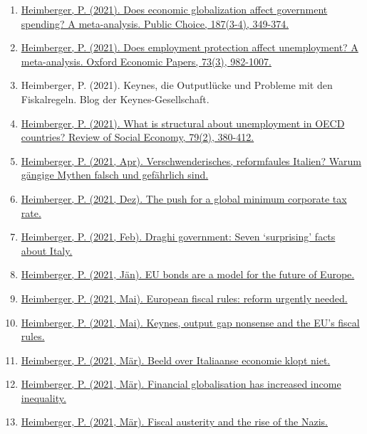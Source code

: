 \begin{enumerate}
	 \item \href{https://doi.org/10.1007/s11127-020-00784-8}{Heimberger, P. (2021). Does economic globalization affect government spending? A meta-analysis. Public Choice, 187(3-4), 349-374.}
	 \item \href{https://doi.org/10.1093/oep/gpaa037}{Heimberger, P. (2021). Does employment protection affect unemployment? A meta-analysis. Oxford Economic Papers, 73(3), 982-1007.}
	 \item Heimberger, P. (2021). Keynes, die Outputlücke und Probleme mit den Fiskalregeln. Blog der Keynes-Gesellschaft.
	 \item \href{https://doi.org/10.1080/00346764.2019.1678067}{Heimberger, P. (2021). What is structural about unemployment in OECD countries? Review of Social Economy, 79(2), 380-412.}
	 \item \href{https://jbi.or.at/wp-content/uploads/2021/05/Perspektiven_2021_04_final.pdf}{Heimberger, P. (2021, Apr). Verschwenderisches, reformfaules Italien? Warum gängige Mythen falsch und gefährlich sind.}
	 \item \href{https://wiiw.ac.at/the-push-for-a-global-minimum-corporate-tax-rate-n-495.html}{Heimberger, P. (2021, Dez). The push for a global minimum corporate tax rate.}
	 \item \href{https://wiiw.ac.at/draghi-government-seven-surprising-facts-about-italy-n-486.html}{Heimberger, P. (2021, Feb). Draghi government: Seven ‘surprising’ facts about Italy.}
	 \item \href{https://wiiw.ac.at/eu-bonds-are-a-model-for-the-future-of-europe-n-480.html}{Heimberger, P. (2021, Jän). EU bonds are a model for the future of Europe.}
	 \item \href{https://feps-europe.eu/european-fiscal-rules-reform-urgently-needed/}{Heimberger, P. (2021, Mai). European fiscal rules: reform urgently needed.}
	 \item \href{https://heimbergecon.substack.com/p/keynes-output-gap-nonsense-and-the}{Heimberger, P. (2021, Mai). Keynes, output gap nonsense and the EU’s fiscal rules.}
	 \item \href{https://www.mejudice.nl/artikelen/detail/beeld-over-italiaanse-economie-klopt-niet}{Heimberger, P. (2021, Mär). Beeld over Italiaanse economie klopt niet.}
	 \item \href{https://braveneweurope.com/philipp-heimberger-financial-globalisation-has-increased-income-inequality}{Heimberger, P. (2021, Mär). Financial globalisation has increased income inequality.}
	 \item \href{https://braveneweurope.com/philipp-heimberger-fiscal-austerity-and-the-rise-of-the-nazis}{Heimberger, P. (2021, Mär). Fiscal austerity and the rise of the Nazis.}

\end{enumerate}
